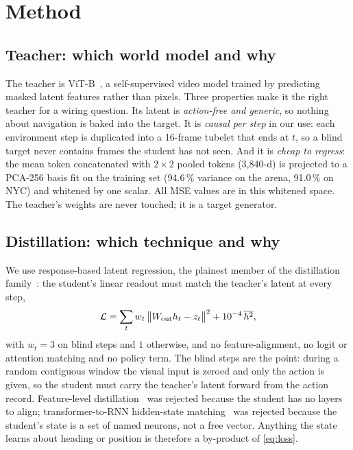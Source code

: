 \section{Method}
\label{sec:method}

\subsection{Teacher: which world model and why}
The teacher is \vjepa ViT-B~\cite{assran2025vjepa2,vjepa21_2026}, a self-supervised video model trained by predicting
masked latent features rather than pixels. Three properties make it the right teacher for a wiring question. Its
latent is \emph{action-free and generic}, so nothing about navigation is baked into the target. It is \emph{causal
per step} in our use: each environment step is duplicated into a 16-frame tubelet that ends at $t$, so a blind
target never contains frames the student has not seen. And it is \emph{cheap to regress}: the mean token concatenated
with $2\times2$ pooled tokens (3,840-d) is projected to a PCA-256 basis fit on the training set (94.6\,\% variance on the
arena, 91.0\,\% on NYC) and whitened by one scalar. All MSE values are in this whitened space. The teacher's weights
are never touched; it is a target generator.

\subsection{Distillation: which technique and why}
We use response-based latent regression, the plainest member of the distillation
family~\cite{hinton2015distilling}: the student's linear readout must match the teacher's latent at every step,
\begin{equation}
  \mathcal{L} = \sum_t w_t\,\big\lVert W_{\rm out} h_t - z_t\big\rVert^2 + 10^{-4}\,\overline{h^2},
  \label{eq:loss}
\end{equation}
with $w_t=3$ on blind steps and $1$ otherwise,
and no feature-alignment, no logit or attention matching and no policy term. The blind steps are the point: during a
random contiguous window the visual input is zeroed and only the action is given, so the student must carry the
teacher's latent forward from the action record. Feature-level distillation~\cite{romero2015fitnets} was rejected
because the student has no layers to align; transformer-to-RNN hidden-state matching~\cite{bick2024transformers} was
rejected because the student's state is a set of named neurons, not a free vector. Anything the state learns about
heading or position is therefore a by-product of \cref{eq:loss}.

